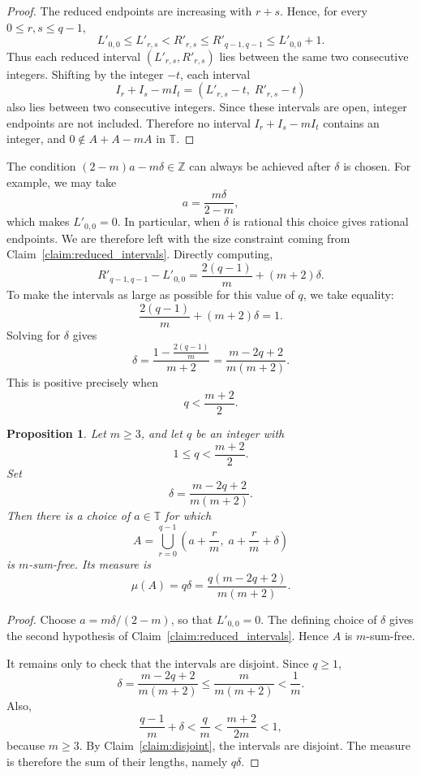 \documentclass{article}
\newtheorem{proposition}{Proposition}
\begin{document}
\begin{proof}
The reduced endpoints are increasing with \(r+s\). Hence, for every
\(0\leq r,s\leq q-1\),
\[
    L'_{0,0}
    \leq
    L'_{r,s}
    <
    R'_{r,s}
    \leq
    R'_{q-1,q-1}
    \leq
    L'_{0,0}+1.
\]
Thus each reduced interval \((L'_{r,s},R'_{r,s})\) lies between the same two
consecutive integers. Shifting by the integer \(-t\), each interval
\[
    I_r+I_s-mI_t=(L'_{r,s}-t,\;R'_{r,s}-t)
\]
also lies between two consecutive integers. Since these intervals are open,
integer endpoints are not included. Therefore no interval \(I_r+I_s-mI_t\)
contains an integer, and \(0\notin A+A-mA\) in \(\mathbb T\).
\end{proof}

The condition \((2-m)a-m\delta\in\mathbb Z\) can always be achieved after
\(\delta\) is chosen. For example, we may take
\[
    a=\frac{m\delta}{2-m},
\]
which makes \(L'_{0,0}=0\). In particular, when \(\delta\) is rational this
choice gives rational endpoints. We are therefore left with the size constraint
coming from Claim~\ref{claim:reduced_intervals}. Directly computing,
\[
    R'_{q-1,q-1}-L'_{0,0}
    =
    \frac{2(q-1)}{m}+(m+2)\delta.
\]
To make the intervals as large as possible for this value of \(q\), we take
equality:
\[
    \frac{2(q-1)}{m}+(m+2)\delta=1.
\]
Solving for \(\delta\) gives
\[
    \delta
    =
    \frac{1-\frac{2(q-1)}{m}}{m+2}
    =
    \frac{m-2q+2}{m(m+2)}.
\]
This is positive precisely when
\[
    q<\frac{m+2}{2}.
\]

\begin{proposition}\label{prop:construction}
Let \(m\geq 3\), and let \(q\) be an integer with
\[
    1\leq q<\frac{m+2}{2}.
\]
Set
\[
    \delta=\frac{m-2q+2}{m(m+2)}.
\]
Then there is a choice of \(a\in\mathbb T\) for which
\[
    A=\bigcup_{r=0}^{q-1}
    \left(a+\frac r m,\; a+\frac r m+\delta\right)
\]
is \(m\)-sum-free. Its measure is
\[
    \mu(A)=q\delta
    =
    \frac{q(m-2q+2)}{m(m+2)}.
\]
\end{proposition}

\begin{proof}
Choose \(a=m\delta/(2-m)\), so that \(L'_{0,0}=0\). The defining choice of
\(\delta\) gives the second hypothesis of Claim~\ref{claim:reduced_intervals}.
Hence \(A\) is \(m\)-sum-free.

It remains only to check that the intervals are disjoint. Since \(q\geq 1\),
\[
    \delta
    =
    \frac{m-2q+2}{m(m+2)}
    \leq
    \frac{m}{m(m+2)}
    <
    \frac1m.
\]
Also,
\[
    \frac{q-1}{m}+\delta
    <
    \frac{q}{m}
    <
    \frac{m+2}{2m}
    <1,
\]
because \(m\geq 3\). By Claim~\ref{claim:disjoint}, the intervals are
disjoint. The measure is therefore the sum of their lengths, namely
\(q\delta\).
\end{proof}
\end{document}
